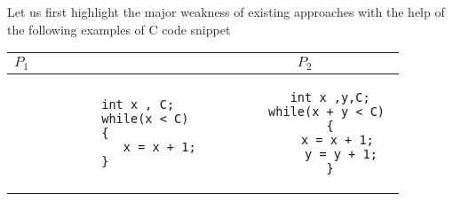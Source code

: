 

Let us first highlight the major weakness of existing approaches with the help of the following examples of C code snippet

\begin{center}
	\begin{tabular}{ l | c }
		\textbf{$P_1$}&\textbf{$P_2$}\\\hline
		\begin{minipage}{0.2\textwidth}
			\begin{verbatim}
			int x , C;
			while(x < C) 
			{
			   x = x + 1; 
			}
			\end{verbatim}
		\end{minipage} 
	     & 
	\begin{minipage}{0.2\textwidth}
		\begin{verbatim}
	   int x ,y,C;
	   while(x + y < C) 
	   {
	      x = x + 1; 
	      y = y + 1;
	   }
	\end{verbatim}
	\end{minipage}
    
	\end{tabular}
\end{center}

